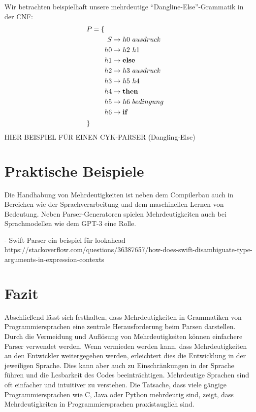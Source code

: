 \documentclass[runningheads]{llncs}
\begin{document}
	Wir betrachten beispielhaft unsere mehrdeutige ``Dangline-Else''-Grammatik in der CNF:
	\begin{align*}
		& P = \{ \begin{aligned}[t]
			         \\
			         S & \rightarrow h0 \ ausdruck \\
			         h0 & \rightarrow h2 \ h1 \\
			         h1 & \rightarrow \bold{else} \\
			         h2 & \rightarrow h3 \ ausdruck \\
			         h3 & \rightarrow h5 \ h4 \\
			         h4 & \rightarrow \bold{then} \\
			         h5 & \rightarrow h6 \ bedingung \\
			         h6 & \rightarrow \bold{if} \\
		\end{aligned} \\
		& \}
	\end{align*}
	HIER BEISPIEL FÜR EINEN CYK-PARSER (Dangling-Else)


	\section{Praktische Beispiele}\label{sec:praktische-beispiele}

	Die Handhabung von Mehrdeutigkeiten ist neben dem Compilerbau
	auch in Bereichen wie der Sprachverarbeitung und dem maschinellen Lernen von Bedeutung.
	Neben Parser-Generatoren spielen Mehrdeutigkeiten auch bei Sprachmodellen wie dem GPT-3 eine Rolle.

	- Swift Parser ein beispiel für lookahead https://stackoverflow.com/questions/36387657/how-does-swift-disambiguate-type-arguments-in-expression-contexts


	\section{Fazit}\label{sec:zusammenfassung}

	Abschließend lässt sich festhalten, dass Mehrdeutigkeiten in Grammatiken von Programmiersprachen
	eine zentrale Herausforderung beim Parsen darstellen.
	Durch die Vermeidung und Auflösung von Mehrdeutigkeiten können einfachere Parser verwendet werden.
	Wenn vermieden werden kann, dass Mehrdeutigkeiten an den Entwickler weitergegeben werden,
	erleichtert dies die Entwicklung in der jeweiligen Sprache.
	Dies kann aber auch zu Einschränkungen in der Sprache führen und die Lesbarkeit des Codes beeinträchtigen.
	Mehrdeutige Sprachen sind oft einfacher und intuitiver zu verstehen.
	Die Tatsache, dass viele gängige Programmiersprachen wie C, Java oder Python mehrdeutig sind,
	zeigt, dass Mehrdeutigkeiten in Programmiersprachen praxistauglich sind.
\end{document}
